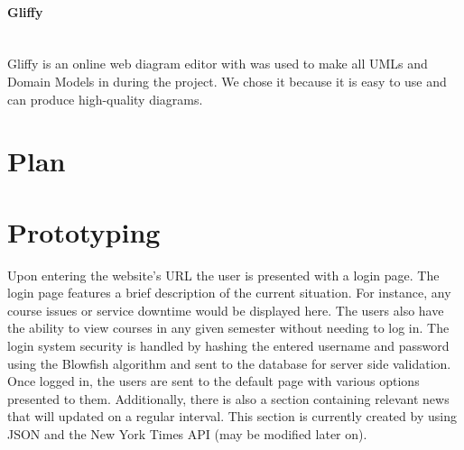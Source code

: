 \documentclass[12pt]{article}
\begin{document}
\paragraph*{Gliffy}~\\
Gliffy is an online web diagram editor with was used to make all UMLs and Domain Models in during the project. We chose it because it is easy to use and can produce high-quality diagrams.
%
\vfill
\newpage
\section{Plan}


\vfill
\newpage

\section{Prototyping}

Upon entering the website’s URL the user is presented with a login page. The login page features a brief description of the current situation. For instance, any course issues or service downtime would be displayed here. The users also have the ability to view courses in any given semester without needing to log in. The login system security is handled by hashing the entered username and password using the Blowfish algorithm and sent to the database for server side validation. 
Once logged in, the users are sent to the default page with various options presented to them.  Additionally, there is also a section containing relevant news that will updated on a regular interval. This section is currently created by using JSON and the New York Times API (may be modified later on). 
\end{document}
